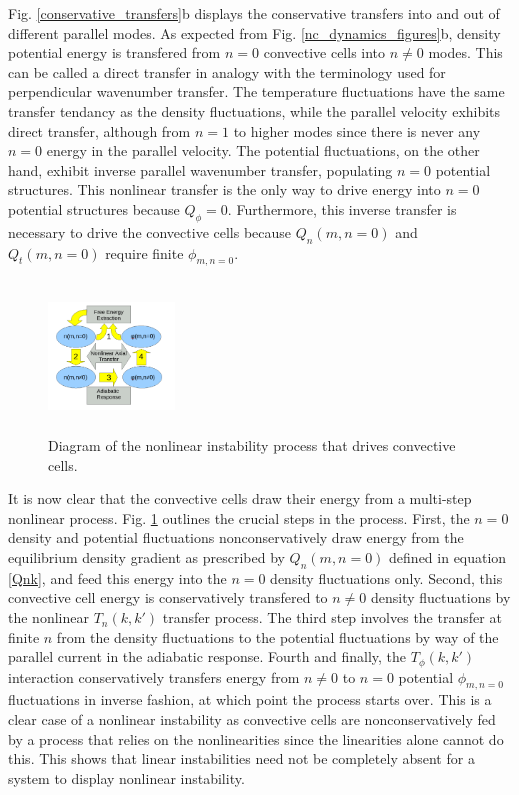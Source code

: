 \documentclass[12pt]{article}
\begin{document}
Fig. \ref{conservative_transfers}b displays the conservative transfers into and out
of different parallel modes. As expected from Fig. \ref{nc_dynamics_figures}b, density potential energy is transfered from $n=0$ convective cells into $n \ne 0$ modes. This can be called a direct
transfer in analogy with the terminology used for perpendicular wavenumber transfer. The temperature fluctuations have the same transfer tendancy 
as the density fluctuations, while the parallel velocity exhibits direct transfer, although from $n=1$ to higher modes since there is never any $n=0$ energy in the parallel velocity.
The potential fluctuations, on the other hand, exhibit inverse parallel wavenumber transfer, populating $n=0$ potential structures. This nonlinear transfer is the only way to drive energy into
$n=0$ potential structures because $Q_\phi=0$. Furthermore, this inverse transfer is necessary to drive the convective cells because $Q_n(m,n=0)$ and $Q_t(m,n=0)$ require finite $\phi_{m,n=0}$. \\

\begin{figure}
\includegraphics[width=0.3\textwidth,height=40mm]{nl_instability_diagram}
\hfil
\caption{Diagram of the nonlinear instability process that drives convective cells.}
\label{nl_instability_diagram}
\end{figure}


It is now clear that the convective cells draw their energy from a multi-step nonlinear process. Fig. \ref{nl_instability_diagram} outlines the crucial steps in the process. 
First, the $n=0$ density and potential fluctuations nonconservatively draw energy from the equilibrium density gradient as prescribed by $Q_n(m,n=0)$ defined in equation \ref{Qnk}, and feed
this energy into the $n=0$ density fluctuations only. Second, this
convective cell energy is conservatively transfered to $n \ne 0$ density fluctuations by the nonlinear $T_n(k,k')$ transfer process. The third step involves the transfer at finite $n$ from the density
fluctuations to the potential fluctuations by way of the parallel current in the adiabatic response. Fourth and finally, the $T_\phi(k,k')$ interaction conservatively transfers energy from
$n \ne 0$ to $n=0$ potential $\phi_{m,n=0}$ fluctuations in inverse fashion, at which point the process starts over. This is a clear case of a nonlinear instability as convective cells
are nonconservatively fed by a process that relies on the nonlinearities since the linearities alone cannot do this. This shows that linear instabilities need not be completely absent 
for a system to display nonlinear instability. \\
\end{document}
